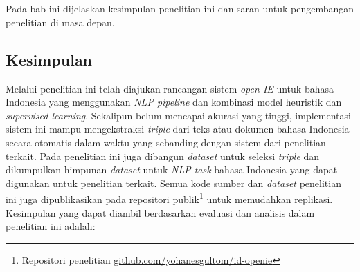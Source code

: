 \chapter{\babLima}
\label{chap:babLima}

Pada bab ini dijelaskan kesimpulan penelitian ini dan saran untuk pengembangan penelitian di masa depan.

\section{Kesimpulan}


Melalui penelitian ini telah diajukan rancangan sistem \textit{open IE} untuk bahasa Indonesia yang menggunakan \textit{NLP pipeline} dan kombinasi model heuristik dan \textit{supervised learning}. Sekalipun belum mencapai akurasi yang tinggi, implementasi sistem ini mampu mengekstraksi \textit{triple} dari teks atau dokumen bahasa Indonesia secara otomatis dalam waktu yang sebanding dengan sistem dari penelitian terkait. Pada penelitian ini juga dibangun \textit{dataset} untuk seleksi \textit{triple} dan dikumpulkan himpunan \textit{dataset} untuk \textit{NLP task} bahasa Indonesia yang dapat digunakan untuk penelitian terkait. Semua kode sumber dan \textit{dataset} penelitian ini juga dipublikasikan pada repositori publik\footnote{Repositori penelitian \url{github.com/yohanesgultom/id-openie}} untuk memudahkan replikasi. Kesimpulan yang dapat diambil berdasarkan evaluasi dan analisis dalam penelitian ini adalah:

